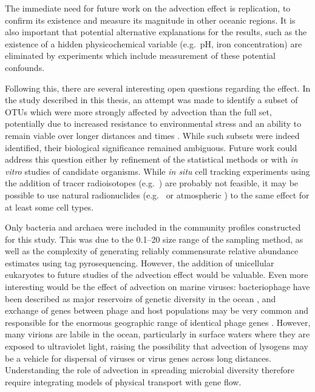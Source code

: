 The immediate need for future work on the advection effect is replication, to confirm its existence and measure its magnitude in other oceanic regions.
It is also important that potential alternative explanations for the results, such as the existence of a hidden physicochemical variable (e.g.\ pH, iron concentration) are eliminated by experiments which include measurement of these potential confounds.

Following this, there are several interesting open questions regarding the effect.
In the study described in this thesis, an attempt was made to identify a subset of \acp{OTU} which were more strongly affected by advection than the full set, potentially due to increased resistance to environmental stress and an ability to remain viable over longer distances and times \cite{Bissett:2010wj}.
While such subsets were indeed identified, their biological significance remained ambiguous.
Future work could address this question either by refinement of the statistical methods or with \textit{in vitro} studies of candidate organisms.
While \textit{in situ} cell tracking experiments using the addition of tracer radioisotopes (e.g.\ ) are probably not feasible, it may be possible to use natural radionuclides (e.g.\  \cite{Savoye:2005ck} or atmospheric  \cite{Feng:1999ww}) to the same effect for at least some cell types.

Only bacteria and archaea were included in the community profiles constructed for this study.
This was due to the 0.1--20 \micron{} size range of the sampling method, as well as the complexity of generating reliably commensurate relative abundance estimates using tag pyrosequencing.
However, the addition of unicellular eukaryotes to future studies of the advection effect would be valuable.
Even more interesting would be the effect of advection on marine viruses: bacteriophage have been described as major reservoirs of genetic diversity in the ocean \cite{Suttle:2005bs}, and exchange of genes between phage and host populations may be very common and responsible for the enormous geographic range of identical phage genes \citep[reviewed in][]{Hambly:2005cm}.
However, many virions are labile in the ocean, particularly in surface waters where they are exposed to ultraviolet light, raising the possibility that advection of lysogens may be a vehicle for dispersal of viruses or virus genes across long distances.
Understanding the role of advection in spreading microbial diversity therefore require integrating models of physical transport with gene flow.

